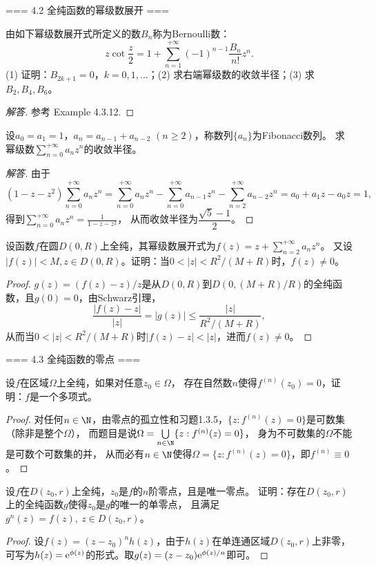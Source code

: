 === 4.2 全纯函数的幂级数展开 ===
\begin{2}
    由如下幂级数展开式所定义的数$B_n$称为Bernoulli数：
    \[z\cot\frac{z}{2}=1+\sum_{n=1}^{+\infty}(-1)^{n-1}\frac{B_n}{n!}z^n.\]
    (1) 证明：$B_{2k+1}=0$，$k=0,1,\dots$；(2) 求右端幂级数的收敛半径；(3) 求$B_2,B_4,B_6$。
\end{2}
\begin{proof}[解答]
    参考\cite{AG} Example 4.3.12.
\end{proof}
\begin{4}
    设$a_0=a_1=1$，$a_n=a_{n-1}+a_{n-2}$ $(n\ge2)$，称数列$\{a_n\}$为Fibonacci数列。
    求幂级数$\sum\limits_{n=0}^{+\infty}a_nz^n$的收敛半径。
\end{4}
\begin{proof}[解答]
    由于
    \[(1-z-z^2)\sum_{n=0}^{+\infty}a_nz^n=\sum_{n=0}^{+\infty}a_nz^n
    -\sum_{n=0}^{+\infty}a_{n-1}z^n-\sum_{n=2}^{+\infty}a_{n-2}z^n=a_0+a_1z-a_0z=1,\]
    得到$\displaystyle\sum_{n=0}^{+\infty}a_nz^n=\frac{1}{1-z-z^2}$，
    从而收敛半径为$\dfrac{\sqrt{5}-1}{2}$。
\end{proof}
\begin{7}
    设函数$f$在圆$D(0,R)$上全纯，其幂级数展开式为$f(z)=z+\sum\limits_{n=2}^{+\infty}a_nz^n$。
    又设$|f(z)|<M,z \in D(0,R)$。证明：当$0<|z|<R^2/(M+R)$时，$f(z)\ne0$。
\end{7}
\begin{proof}
    $g(z)=(f(z)-z)/z$是从$D(0,R)$到$D(0,(M+R)/R)$的全纯函数，且$g(0)=0$，由Schwarz引理，
    \[\frac{|f(z)-z|}{|z|}=|g(z)|\le\frac{|z|}{R^2/(M+R)},\]
    从而当$0<|z|<R^2/(M+R)$时$|f(z)-z|<|z|$，进而$f(z)\ne0$。
\end{proof}

=== 4.3 全纯函数的零点 ===
\begin{8}
    设$f$在区域$\Omega$上全纯，如果对任意$z_0\in\Omega$，
    存在自然数$n$使得$f^{(n)}(z_0)=0$，证明：$f$是一个多项式。
\end{8}
\begin{proof}
    对任何$n\in\N$，由零点的孤立性和习题1.3.5，$\{z:f^{(n)}(z)=0\}$是可数集（除非是整个$\Omega$），
    而题目是说$\Omega=\bigcup\limits_{n\in\N}\{z:f^{(n)}(z)=0\}$，
    身为不可数集的$\Omega$不能是可数个可数集的并，
    从而必有$n\in\N$使得$\Omega=\{z:f^{(n)}(z)=0\}$，即$f^{(n)}\equiv0$。
\end{proof}
\begin{11}
    设$f$在$D(z_0,r)$上全纯，$z_0$是$f$的$n$阶零点，且是唯一零点。
    证明：存在$D(z_0,r)$上的全纯函数$g$使得$z_0$是$g$的唯一的单零点，
    且满足$g^n(z)=f(z),\ z \in D(z_0,r)$。
\end{11}
\begin{proof}
    设$f(z)=(z-z_0)^nh(z)$，由于$h(z)$在单连通区域$D(z_0,r)$上非零，
    可写为$h(z)={\rm e}^{\phi(z)}$的形式。取$g(z)=(z-z_0){\rm e}^{\phi(z)/n}$即可。
\end{proof}

